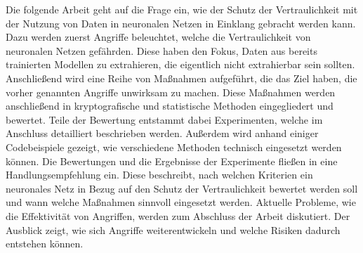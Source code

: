 Die folgende Arbeit geht auf die Frage ein, wie der Schutz der Vertraulichkeit mit der Nutzung von Daten in neuronalen Netzen in Einklang gebracht werden kann.
Dazu werden zuerst Angriffe beleuchtet, welche die Vertraulichkeit von neuronalen Netzen gefährden.
Diese haben den Fokus, Daten aus bereits trainierten Modellen zu extrahieren, die eigentlich nicht extrahierbar sein sollten.
Anschließend wird eine Reihe von Maßnahmen aufgeführt, die das Ziel haben, die vorher genannten Angriffe unwirksam zu machen.
Diese Maßnahmen werden anschließend in kryptografische und statistische Methoden eingegliedert und bewertet.
Teile der Bewertung entstammt dabei Experimenten, welche im Anschluss detailliert beschrieben werden.
Außerdem wird anhand einiger Codebeispiele gezeigt, wie verschiedene Methoden technisch eingesetzt werden können.
Die Bewertungen und die Ergebnisse der Experimente fließen in eine Handlungsempfehlung ein.
Diese beschreibt, nach welchen Kriterien ein neuronales Netz in Bezug auf den Schutz der Vertraulichkeit bewertet werden soll und wann welche Maßnahmen sinnvoll eingesetzt werden.
Aktuelle Probleme, wie die Effektivität von Angriffen, werden zum Abschluss der Arbeit diskutiert.
Der Ausblick zeigt, wie sich Angriffe weiterentwickeln und welche Risiken dadurch entstehen können.
